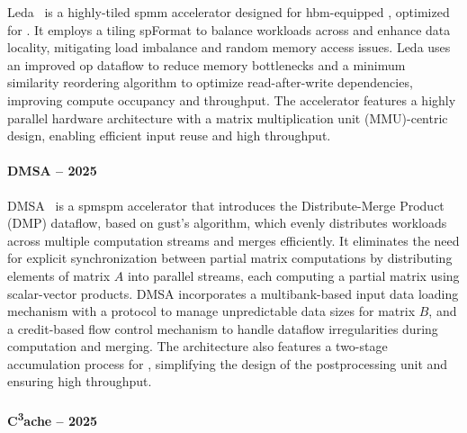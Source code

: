 Leda~\cite{Yi2025_Leda} is a highly-tiled \acrshort{spmm} accelerator designed for \acrshort{hbm}-equipped , optimized for .
It employs a \gls{tiling} \gls{spFormat} to balance workloads across  and enhance data locality, mitigating load imbalance and random memory access issues.
Leda uses an improved \acrlong{op} dataflow to reduce memory bottlenecks and a minimum similarity reordering algorithm to optimize read-after-write dependencies, improving compute occupancy and throughput.
The accelerator features a highly parallel hardware architecture with a matrix multiplication unit (MMU)-centric design, enabling efficient input reuse and high throughput.

\paragraph{DMSA -- 2025}

DMSA~\cite{Nagahara2025_DMSA} is a \acrshort{spmspm} accelerator that introduces the Distribute-Merge Product (DMP) dataflow, based on \acrlong{gust}'s algorithm, which evenly distributes workloads across multiple computation streams and merges  efficiently.
It eliminates the need for explicit synchronization between partial matrix computations by distributing elements of matrix $A$ into parallel streams, each computing a partial matrix using scalar-vector products.
DMSA incorporates a multibank-based input data loading mechanism with a protocol to manage unpredictable data sizes for matrix $B$, and a credit-based flow control mechanism to handle dataflow irregularities during computation and merging.
The architecture also features a two-stage accumulation process for , simplifying the design of the postprocessing unit and ensuring high throughput.

\paragraph{C\textsuperscript{3}ache -- 2025}

